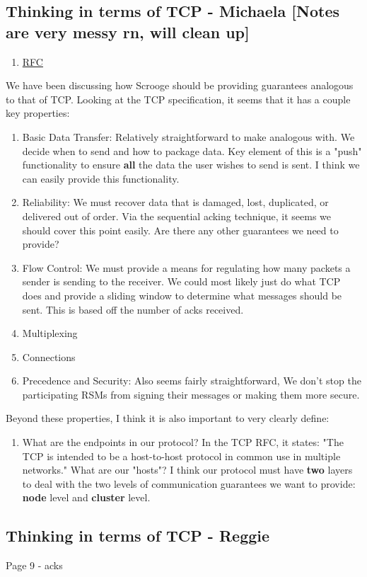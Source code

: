 \subsection{Thinking in terms of TCP - Michaela [Notes are very messy rn, will clean up]}
\begin{enumerate}
	\item \href{https://www.ietf.org/rfc/rfc793.txt}{RFC}
\end{enumerate}
We have been discussing how Scrooge should be providing guarantees analogous to that of TCP. Looking at the TCP specification, it seems that it has 
a couple key properties:
\begin{enumerate}
	\item Basic Data Transfer: Relatively straightforward to make analogous with. We decide when to send and how to package data.
		Key element of this is a "push" functionality to ensure \textbf{all} the data the user wishes to send is sent. I think we can
		easily provide this functionality.
	\item Reliability: We must recover data that is damaged, lost, duplicated, or delivered out of order. Via the sequential acking
		technique, it seems we should cover this point easily. Are there any other guarantees we need to provide?
	\item Flow Control: We must provide a means for regulating how many packets a sender is sending to the receiver. We could most
		likely just do what TCP does and provide a sliding window to determine what messages should be sent. This is based off the
		number of acks received.
	\item Multiplexing
	\item Connections
	\item Precedence and Security: Also seems fairly straightforward, We don't stop the participating RSMs from signing their messages
		or making them more secure.
\end{enumerate}

Beyond these properties, I think it is also important to very clearly define:
\begin{enumerate}
	\item What are the endpoints in our protocol? In the TCP RFC, it states: "The TCP is intended to be a host-to-host protocol 
		in common use in multiple networks." What are our "hosts"? I think our protocol must have \textbf{two} layers to deal with
		the two levels of communication guarantees we want to provide: \textbf{node} level and \textbf{cluster} level.
\end{enumerate}

\subsection{Thinking in terms of TCP - Reggie}

Page 9 - acks


